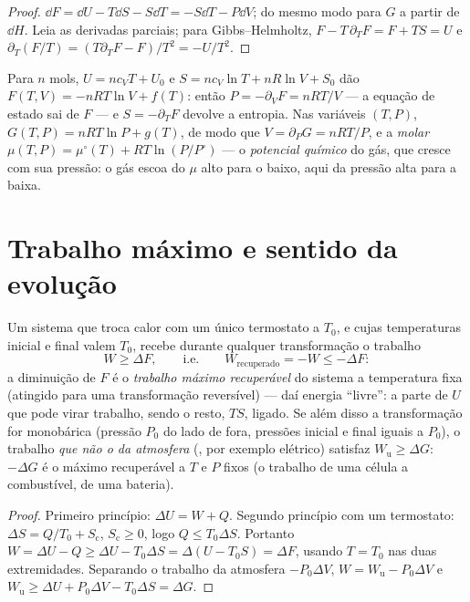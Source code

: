 \begin{proof}
$\dd F = \dd U - T\dd S - S\dd T = -S\dd T - P\dd V$; do mesmo modo para $G$
a partir de $\dd H$. Leia as derivadas parciais; para Gibbs--Helmholtz,
$F - T\,\partial_TF = F + TS = U$ e $\partial_T(F/T) = (T\partial_TF -
F)/T^2 = -U/T^2$.
\end{proof}

\begin{example}\label{ex:b2:thermodynamic-potentials:perfect}
Para $n$ mols, $U = nc_{V}T + U_0$ e $S = nc_V\ln T + nR\ln V + S_0$
dão $F(T,V) = -nRT\ln V + f(T)$: então $P = -\partial_VF = nRT/V$
--- a equação de estado sai de $F$ --- e $S = -\partial_TF$
devolve a entropia. Nas variáveis $(T,P)$, $G(T,P) = nRT\ln P +
g(T)$, de modo que $V = \partial_PG = nRT/P$, e a  \emph{molar}
$\mu(T,P) = \mu^\circ(T) + RT\ln(P/P^\circ)$ --- o \emph{potencial
químico} do gás, que cresce com sua
pressão: o gás escoa do $\mu$ alto para o baixo, aqui da pressão alta para a
baixa.
\end{example}

\section{Trabalho máximo e sentido da evolução}

\begin{theorem}\label{thm:b2:thermodynamic-potentials:monothermal}
Um sistema que troca calor com um único termostato a $T_0$, e cujas
temperaturas inicial e final valem $T_0$, recebe durante qualquer
transformação o trabalho
\[
W \ge \Delta F , \qquad\text{i.e.}\qquad W_{\text{recuperado}} = -W \le -\Delta F :
\]
a diminuição de $F$ é o \emph{trabalho máximo recuperável} do
sistema a temperatura fixa (atingido para uma transformação reversível) ---
daí energia ``livre'': a parte de $U$ que pode virar trabalho, sendo o
resto, $TS$, ligado. Se além disso a transformação for monobárica
(pressão $P_0$ do lado de fora, pressões inicial e final iguais a $P_0$), o trabalho
\emph{que não o da atmosfera} (, por exemplo elétrico)
satisfaz $W_{\text{u}} \ge \Delta G$: $-\Delta G$ é o  máximo
recuperável a $T$ e $P$ fixos (o trabalho de uma célula a combustível, de uma
bateria).
\end{theorem}

\begin{proof}
Primeiro princípio: $\Delta U = W + Q$. Segundo princípio com um termostato: $\Delta S
= Q/T_0 + S_{\text{c}}$, $S_{\text{c}} \ge 0$, logo $Q \le T_0\Delta S$. Portanto
$W = \Delta U - Q \ge \Delta U - T_0\Delta S = \Delta(U - T_0S) = \Delta F$, usando
$T = T_0$ nas duas extremidades. Separando o trabalho da atmosfera $-P_0\Delta V$,
$W = W_{\text{u}} - P_0\Delta V$ e $W_{\text{u}} \ge \Delta U + P_0
\Delta V - T_0\Delta S = \Delta G$.
\end{proof}

